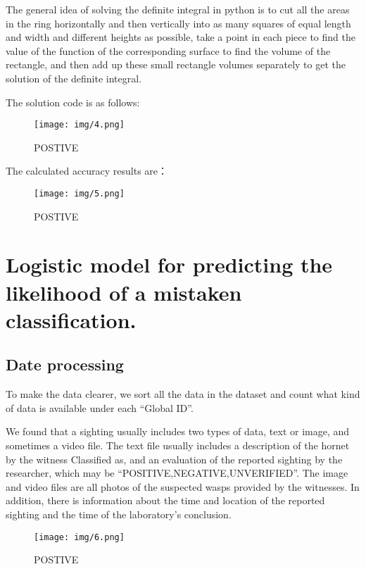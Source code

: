 \documentclass{mcmthesis}
\begin{document}
The general idea of solving the definite integral in python is to cut all the areas in the ring horizontally and then vertically into as many squares of equal length and width and different heights as possible, take a point in each piece to find the value of the function of the corresponding surface to find the volume of the rectangle, and then add up these small rectangle volumes separately to get the solution of the definite integral.

The solution code is as follows:

\begin{figure}[H]
    \centering
    \texttt{[image: img/4.png]}
    \caption{POSTIVE}
    \label{POSTIVE}
\end{figure}

The calculated accuracy results are：

\begin{figure}[H]
    \centering
    \texttt{[image: img/5.png]}
    \caption{POSTIVE}
    \label{POSTIVE}
\end{figure}

\section{Logistic model for predicting the likelihood of a mistaken classification.}

\subsection{Date processing}

To make the data clearer, we sort all the data in the dataset and count what kind of data is available under each “Global ID”.

We found that a sighting usually includes two types of data, text or image, and sometimes a video file. The text file usually includes a description of the hornet by the witness Classified as, and an evaluation of the reported sighting by the researcher, which may be “POSITIVE,NEGATIVE,UNVERIFIED”. The image and video files are all photos of the suspected wasps provided by the witnesses. In addition, there is information about the time and location of the reported sighting and the time of the laboratory's conclusion.

\begin{figure}[h]
    \centering
    \texttt{[image: img/6.png]}
    \caption{POSTIVE}
    \label{POSTIVE}
\end{figure}
\end{document}
